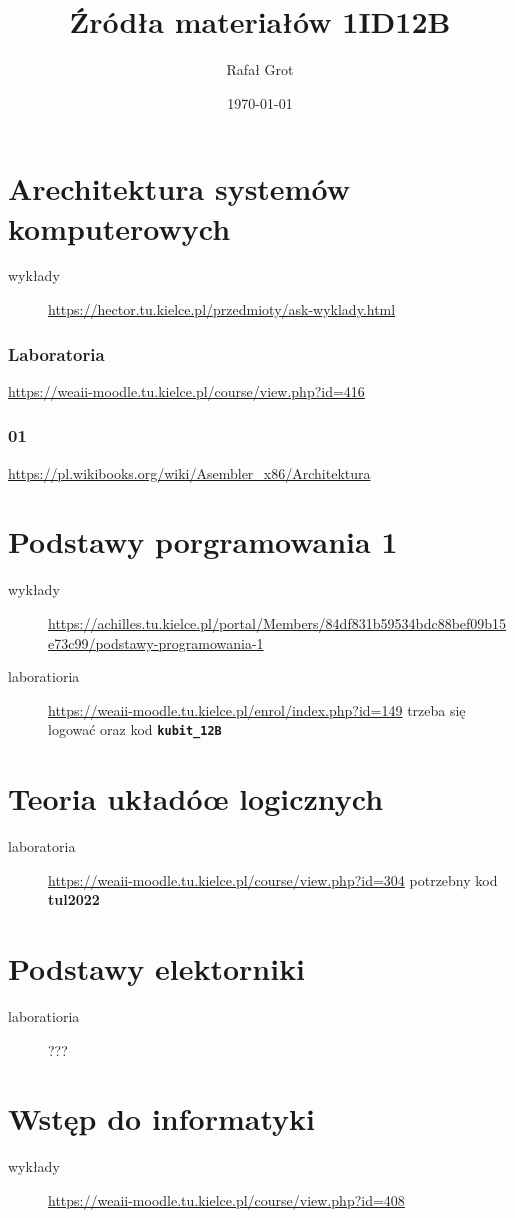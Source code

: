 \documentclass[11pt]{article}
\author{Rafał Grot}
\date{\today}
\title{Źródła materiałów 1ID12B}
\begin{document}
\maketitle
\tableofcontents


\section{Arechitektura systemów komputerowych}
\label{sec:org0c40ad0}
\begin{description}
\item[{wykłady}] \url{https://hector.tu.kielce.pl/przedmioty/ask-wyklady.html}
\end{description}
\subsubsection{Laboratoria}
\label{sec:org81c7b7b}
\url{https://weaii-moodle.tu.kielce.pl/course/view.php?id=416}
\subsubsection{01}
\label{sec:org1c39d61}
\url{https://pl.wikibooks.org/wiki/Asembler\_x86/Architektura}
\section{Podstawy porgramowania 1}
\label{sec:org1fe69e6}
\begin{description}
\item[{wykłady}] \url{https://achilles.tu.kielce.pl/portal/Members/84df831b59534bdc88bef09b15e73c99/podstawy-programowania-1}
\item[{laboratioria}] \url{https://weaii-moodle.tu.kielce.pl/enrol/index.php?id=149} trzeba się logować oraz kod \textbf{\texttt{kubit\_12B}}
\end{description}
\section{Teoria układóœ logicznych}
\label{sec:orge5bb454}
\begin{description}
\item[{laboratoria}] \url{https://weaii-moodle.tu.kielce.pl/course/view.php?id=304} potrzebny kod \textbf{tul2022}
\end{description}
\section{Podstawy elektorniki}
\label{sec:org8b911bb}
\begin{description}
\item[{laboratioria}] ???
\end{description}
\section{Wstęp do informatyki}
\label{sec:org8c9eb13}
\begin{description}
\item[{wykłady}] \url{https://weaii-moodle.tu.kielce.pl/course/view.php?id=408}
\end{description}
\end{document}
